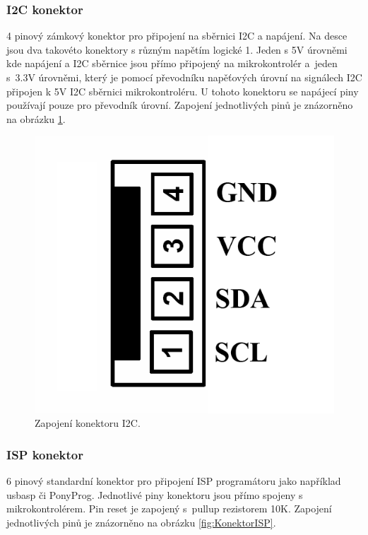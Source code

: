\documentclass[a4paper,11pt]{article}
\begin{document}
\subsubsection{I2C konektor}
4 pinový zámkový konektor pro připojení na sběrnici I2C a napájení. Na desce jsou dva takovéto konektory s různým napětím logické 1. Jeden s 5V úrovněmi kde napájení a I2C sběrnice jsou přímo připojený na mikrokontrolér a~jeden s~3.3V úrovněmi, který je pomocí převodníku napěťových úrovní na signálech I2C připojen k 5V I2C sběrnici mikrokontroléru. U tohoto konektoru se napájecí piny používají pouze pro převodník úrovní. Zapojení jednotlivých pinů je znázorněno na obrázku \ref{fig:KonektorI2C}.
	
\begin{figure}[htbp]
	\centering
		\includegraphics[scale=0.25]{KonektorI2C.png}
	\caption{Zapojení konektoru I2C.}
	\label{fig:KonektorI2C}
\end{figure}
	
\newpage	
\subsubsection{ISP konektor}
6 pinový standardní konektor pro připojení ISP programátoru jako například usbasp či PonyProg. Jednotlivé piny konektoru jsou přímo spojeny s mikrokontrolérem. Pin reset je zapojený s~pullup rezistorem 10K. Zapojení jednotlivých pinů je znázorněno na obrázku \ref{fig:KonektorISP}.
\end{document}

